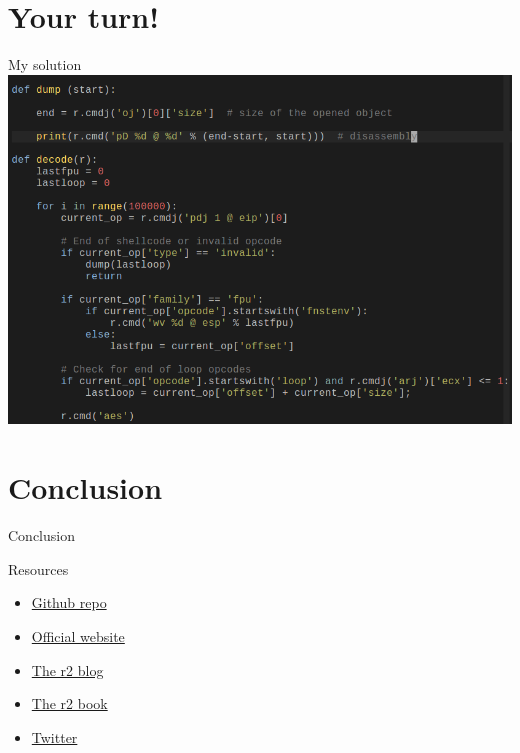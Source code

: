 \documentclass{beamer}
\begin{document}
\section{Your turn!}

\begin{frame}{My solution}
	\includegraphics[width=\textwidth]{solution.png}
\end{frame}

\section*{Conclusion}
\begin{frame}{Conclusion}
	\begin{center}
	\end{center}
\end{frame}

\begin{frame}{Resources}
	\begin{itemize}
		\item \href{https://github.com/radare/radare2}{Github repo}
		\item \href{http://rada.re}{Official website}
		\item \href{http://radare.today}{The r2 blog}
		\item \href{http://maijin.github.io/radare2book/}{The r2 book}
		\item \href{https://twitter.com/radareorg}{Twitter}
	\end{itemize}
\end{frame}
\end{document}
